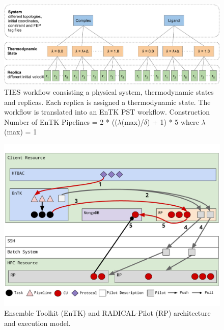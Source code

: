 \begin{figure}
  \centering
  \includegraphics[width=\columnwidth]{figures/ties_workflow.pdf}
  \caption{TIES workflow consisting a physical system, thermodynamic states
  and replicas. Each replica is assigned a thermodynamic state. The workflow
  is translated into an EnTK PST workflow. Construction Number of EnTK
  Pipelines = 2 * (($\lambda$(max)/$\delta$) + 1) * 5 where $\lambda$(max) =
  1 }
\label{fig:ties_workflow}
\end{figure}

  
\begin{figure}
  \centering
  \includegraphics[width=\columnwidth]{figures/ht-bac-rp_integration.pdf}
  \caption{Ensemble Toolkit (EnTK) and RADICAL-Pilot (RP) architecture and
  execution model.}
\label{fig:integration}
\end{figure}



